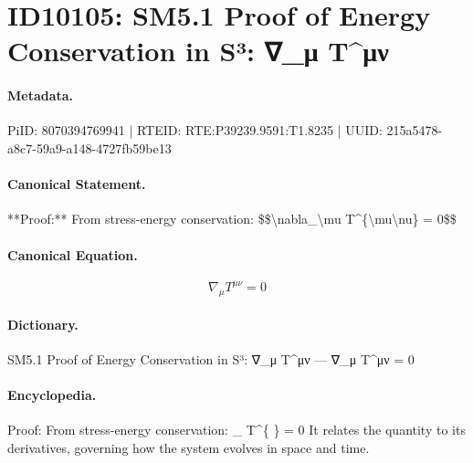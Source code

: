 \section*{ID10105: SM5.1 Proof of Energy Conservation in S³: ∇\_μ T\textasciicircum{}μν}
\paragraph{Metadata.}
PiID: 8070394769941 | RTEID: RTE:P39239.9591:T1.8235 | UUID: 215a5478-a8c7-59a9-a148-4727fb59be13

\paragraph{Canonical Statement.}
**Proof:** From stress-energy conservation: \$\$\textbackslash{}nabla\_\textbackslash{}mu T\textasciicircum{}\{\textbackslash{}mu\textbackslash{}nu\} = 0\$\$

\paragraph{Canonical Equation.}
\[
\nabla_\mu T^{\mu\nu} = 0
\]

\paragraph{Dictionary.}
SM5.1 Proof of Energy Conservation in S³: ∇\_μ T\textasciicircum{}μν — ∇\_μ T\textasciicircum{}μν = 0

\paragraph{Encyclopedia.}
Proof: From stress-energy conservation: \_ T\textasciicircum{}\{ \} = 0 It relates the quantity to its derivatives, governing how the system evolves in space and time.
